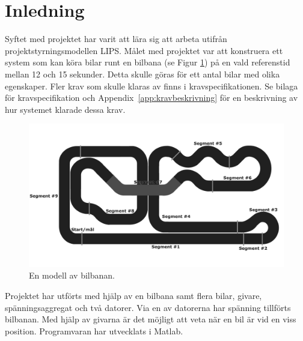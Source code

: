 \section{Inledning}

Syftet med projektet har varit att lära sig att arbeta utifrån
projektstyrningsmodellen LIPS. Målet med projektet var att konstruera ett system
som kan köra bilar runt en bilbana (se Figur \ref{fig:bilbanan}) på en vald referenstid mellan 12 och 15
sekunder. Detta skulle göras för ett antal bilar med olika egenskaper. Fler krav
som skulle klaras av finns i kravspecifikationen. Se bilaga för kravspecifikation och Appendix~\ref{app:kravbeskrivning} för en beskrivning av
hur systemet klarade dessa krav.

\begin{figure}
	\centering
	\includegraphics[width=\linewidth] {Figures/BanaModell}
	\caption{En modell av bilbanan.}
	\label{fig:bilbanan}
\end{figure} 

Projektet har utförts med hjälp av en bilbana samt flera bilar, givare,
spänningsaggregat och två datorer. Via en av datorerna har spänning tillförts
bilbanan. Med hjälp av givarna är det möjligt att veta när en bil är vid en viss
position. Programvaran har utvecklats i Matlab.